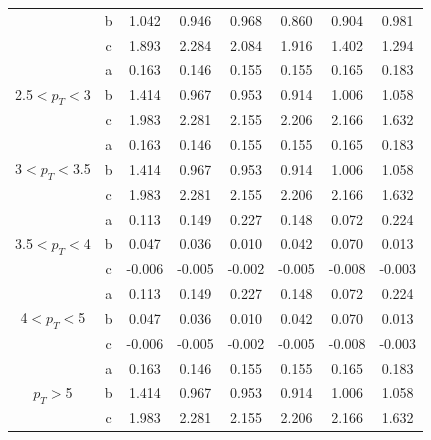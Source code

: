 \begin{small}
\begin{center}
\begin{longtable}{c|c|c|c|c|c|c|c}
& b  &1.042 &0.946 &0.968 &0.860 &0.904 &0.981\\
& c  &1.893 &2.284 &2.084 &1.916 &1.402 &1.294\\ \hline
\multirow{3}{*}{2.5$< p_T <$3}& a  &0.163 &0.146 &0.155 &0.155 &0.165 &0.183\\
& b  &1.414 &0.967 &0.953 &0.914 &1.006 &1.058\\
& c  &1.983 &2.281 &2.155 &2.206 &2.166 &1.632\\ \hline
\multirow{3}{*}{3$< p_T <$3.5}& a  &0.163 &0.146 &0.155 &0.155 &0.165 &0.183\\
& b  &1.414 &0.967 &0.953 &0.914 &1.006 &1.058\\
& c  &1.983 &2.281 &2.155 &2.206 &2.166 &1.632\\ \hline
\multirow{3}{*}{3.5$< p_T <$4}& a  &0.113 &0.149 &0.227 &0.148 &0.072 &0.224\\
& b  &0.047 &0.036 &0.010 &0.042 &0.070 &0.013\\
& c  &-0.006 &-0.005 &-0.002 &-0.005 &-0.008 &-0.003\\ \hline
\multirow{3}{*}{4$< p_T <$5}& a  &0.113 &0.149 &0.227 &0.148 &0.072 &0.224\\
& b  &0.047 &0.036 &0.010 &0.042 &0.070 &0.013\\
& c  &-0.006 &-0.005 &-0.002 &-0.005 &-0.008 &-0.003\\ \hline
\multirow{3}{*}{$ p_T >$5}& a  &0.163 &0.146 &0.155 &0.155 &0.165 &0.183\\
& b  &1.414 &0.967 &0.953 &0.914 &1.006 &1.058\\
& c  &1.983 &2.281 &2.155 &2.206 &2.166 &1.632\\ \hline


\end{longtable}
\end{center}
\end{small}

